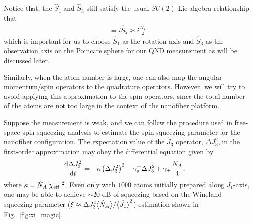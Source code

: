 \documentclass[preprint,aps,pra,onecolumn]{revtex4-1} %
\begin{document}
Notice that, the $ \hat{S}_1 $ and $ \hat{S}_3 $ still satisfy the usual $ SU(2) $ Lie algebra relationship that 
\begin{align}
[\hat{S}_3,\hat{S}_1] = i \hat{S}_2 \approx i\frac{\dot{N}_L}{2}
\end{align}
which is important for us to choose $ \hat{S}_1 $ as the rotation axis and $ \hat{S}_3 $ as the observation axis on the Poincare sphere for our QND measurement as will be discussed later. 

Similarly, when the atom number is large, one can also map the angular momentum/spin operators to the quadrature operators. However, we will try to avoid applying this approximation to the spin operators, since the total number of the atoms are not too large in the context of the nanofiber platform. 

Suppose the measurement is weak, and we can follow the procedure used in free-space spin-squeezing analysis to estimate the spin squeezing parameter for the nanofiber configuration. 
The expectation value of the $ \hat{J}_3 $ operator, $ \Delta J_3^2 $, in the first-order approximation may obey the differential equation given by 
\begin{align}
\frac{{\mathrm d} {\Delta J_3^2}}{{\mathrm d}t} &= -\kappa \left(\Delta J_3^2 \right)^2 -\gamma_s^+ \Delta J_3^2 + \gamma_+\frac{N_A}{4},
\end{align}
where $ \kappa=\dot{N}_A |\chi_{\rm eff}|^2$. 
Even only with $1000$ atoms initially prepared along $ J_1 $-axis, one may be able to achieve $ \sim 20 $ dB of squeezing based on the Wineland squeezing parameter ($ \xi\approx \Delta J_3^2 \big\langle \hat{N}_A \big\rangle/\big\langle \hat{J}_1 \big\rangle^2 $) estimation shown in Fig.~\ref{fig:xi_magic}. 
\end{document}

